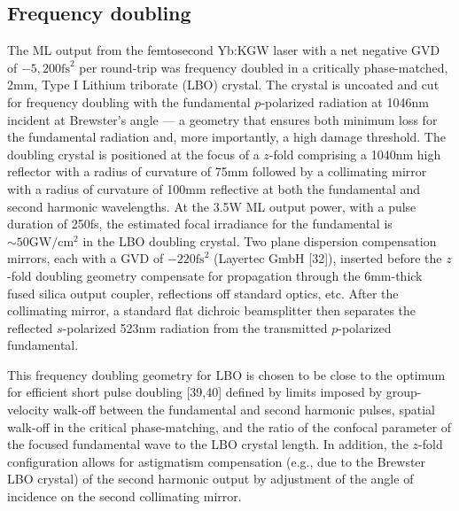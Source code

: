 
\subsection{Frequency doubling}


The ML output from the femtosecond Yb:KGW laser with a net negative GVD of $-5,200\text{fs}^2$ per round-trip was frequency doubled in a critically phase-matched, 2mm, Type I Lithium triborate (LBO) crystal.
The crystal is uncoated and cut for frequency doubling with the fundamental $p$-polarized radiation at 1046nm incident at Brewster’s angle --- a geometry that ensures both minimum loss for the fundamental radiation and, more importantly, a high damage threshold.
The doubling crystal is positioned at the focus of a $z$-fold comprising a 1040nm high reflector with a radius of curvature of 75mm followed by a collimating mirror with a radius of curvature of 100mm reflective at both the fundamental and second harmonic wavelengths.
At the 3.5W ML output power, with a pulse duration of 250fs, the estimated focal irradiance for the fundamental is $\sim50\text{GW}/\text{cm}^2$ in the LBO doubling crystal.
Two plane dispersion compensation mirrors, each with a GVD of $-220\text{fs}^2$ (Layertec GmbH [32]), inserted before the $z$-fold doubling geometry compensate for propagation through the 6mm-thick fused silica output coupler, reflections off standard optics, etc.
After the collimating
mirror, a standard flat dichroic beamsplitter then separates the reflected $s$-polarized 523nm radiation from the transmitted $p$-polarized fundamental.

This frequency doubling geometry for LBO is chosen to be close to the optimum for efficient short pulse doubling [39,40] defined by limits imposed by group-velocity walk-off between the fundamental and second harmonic pulses, spatial walk-off in the critical phase-matching, and the ratio of the confocal parameter of the focused fundamental wave to the LBO crystal length.
In addition, the $z$-fold configuration allows for astigmatism compensation (e.g., due to the Brewster LBO crystal) of the second harmonic output by adjustment of the angle of incidence on the second collimating mirror.

